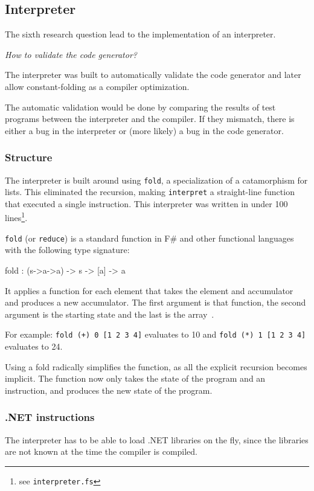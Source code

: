 \subsection{Interpreter}
The sixth research question lead to the implementation of an interpreter.

\textit{How to validate the code generator?}

The interpreter was built to automatically validate the code generator and later allow constant-folding as a compiler optimization.

The automatic validation would be done by comparing the results of test programs between the interpreter and the compiler.
If they mismatch, there is either a bug in the interpreter or (more likely) a bug in the code generator.

\subsubsection{Structure}
The interpreter is built around using \verb|fold|, a specialization of a catamorphism for lists\cite{gibbons}.
This eliminated the recursion, making \verb|interpret| a straight-line function that executed a single instruction.
This interpreter was written in under 100 lines\footnote{see \texttt{interpreter.fs}}.

\verb|fold| (or \verb|reduce|) is a standard function in F\# and other functional languages with the following type signature:

\begin{FS}
    fold : (s->a->a) -> s -> [a] -> a
\end{FS}

It applies a function for each element that takes the element and accumulator and produces a new accumulator.
The first argument is that function, the second argument is the starting state and the last is the array~\cite{realworldhaskell}.

For example: \texttt{fold (+) 0 [1 2 3 4]} evaluates to 10 and \texttt{fold (*) 1 [1 2 3 4]} evaluates to 24.

Using a fold radically simplifies the function, as all the explicit recursion becomes implicit.
The function now only takes the state of the program and an instruction, and produces the new state of the program.

\subsubsection{.NET instructions}
The interpreter has to be able to load .NET libraries on the fly, since the libraries are not known at the time the compiler is compiled.

